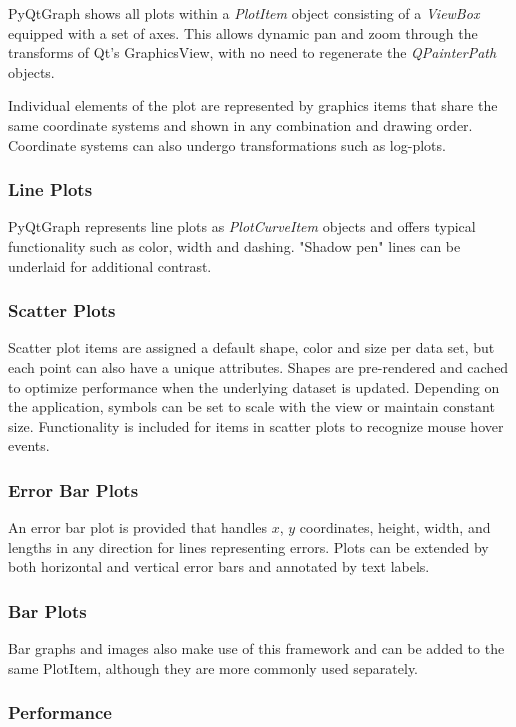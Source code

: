 \documentclass[journal]{vgtc}                %
\begin{document}
PyQtGraph shows all plots within a \emph{PlotItem} object consisting of a \emph{ViewBox} equipped with a set of axes. This allows dynamic pan and zoom through the transforms of Qt's GraphicsView, with no need to regenerate the \emph{QPainterPath} objects.

Individual elements of the plot are represented by graphics items that share the same coordinate systems and shown in any combination and drawing order.  Coordinate systems can also undergo transformations such as log-plots.

\subsubsection{Line Plots}
PyQtGraph represents line plots as \emph{PlotCurveItem} objects and offers typical functionality such as color, width and dashing. "Shadow pen" lines can be underlaid for additional contrast. 


\subsubsection{Scatter Plots}

Scatter plot items are assigned a default shape, color and size per data set, but each point can also have a unique attributes. Shapes are pre-rendered and cached to optimize performance when the underlying dataset is updated. Depending on the application, symbols can be set to scale with the view or maintain constant size.  Functionality is included for items in scatter plots to recognize mouse hover events.

\subsubsection{Error Bar Plots}

An error bar plot is provided that handles $x$, $y$ coordinates, height, width, and lengths in any direction for lines representing errors.  Plots can be extended by both horizontal and vertical error bars and annotated by text labels.

\subsubsection{Bar Plots}

Bar graphs and images also make use of this framework and can be added to the same PlotItem, although they are more commonly used separately.


\subsubsection{Performance}
\end{document}
